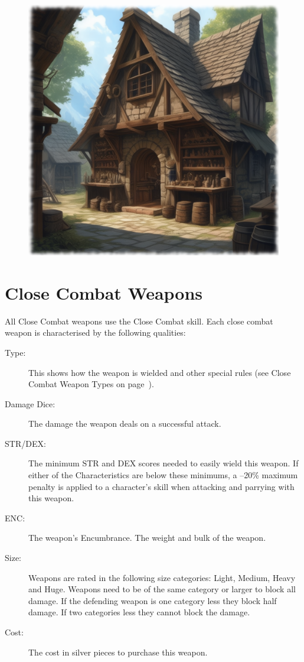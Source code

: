 \begin{figure}[h]
\begin{center}
\includegraphics[scale=0.24]{img/ai-images/shop.png}
\end{center}
\end{figure}

\section{Close Combat Weapons}
All Close Combat weapons use the Close Combat skill. Each close combat weapon is characterised by the following qualities: 

\begin{description}
	\item[Type:] This shows how the weapon is wielded and other special rules (see Close Combat Weapon Types on page~\pageref{sssec:close-combat-weapon-types}).
	\item[Damage Dice:] The damage the weapon deals on a successful attack. 
	\item[STR/DEX:] The minimum STR and DEX scores needed to easily wield this weapon. If either of the Characteristics are below these minimums, a –20\% maximum penalty is applied to a character’s skill when attacking and parrying with this weapon. 
	\item[ENC:] The weapon’s Encumbrance. The weight and bulk of the weapon. 
	\item[Size:] Weapons are rated in the following size categories: Light, Medium, Heavy and Huge. Weapons need to be of the same category or larger to block all damage. If the defending weapon is one category less they block half damage. If two categories less they cannot block the damage.
	\item[Cost:] The cost in silver pieces to purchase this weapon. 
\end{description}

